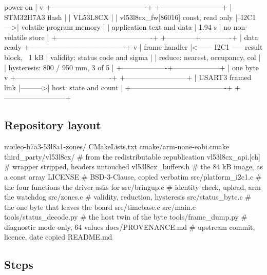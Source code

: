 \begin{asciiart}
  power-on
     |
     v
  +----------------------------------------+          +--------------------------+
  | STM32H7A3 flash                        |          | VL53L8CX                 |
  |   vl53l8cx_fw[86016] const, read only  |--I2C1--->| volatile program memory  |
  |   application text and data            |  1.94 s  |   no non-volatile store  |
  +----------------------------------------+          +------------+-------------+
                                                                   | data ready
  +----------------------------------------+                       v
  | frame handler                          |<------ I2C1 ----- result block, ~1 kB
  |   validity:   status code and sigma    |
  |   reduce:     nearest, occupancy, col  |
  |   hysteresis: 800 / 950 mm, 3 of 5     |
  +-------------------+--------------------+
                      | one byte
                      v
  +----------------------------------------+          +--------------------------+
  | USART3 framed link                     |--------->| host: state and count    |
  +----------------------------------------+          +--------------------------+
\end{asciiart}

\subsection*{Repository layout}

\begin{plaincode}
nucleo-h7a3-53l8a1-zones/
  CMakeLists.txt
  cmake/arm-none-eabi.cmake
  third_party/vl53l8cx/        # from the redistributable republication
    vl53l8cx_api.[ch]          # wrapper stripped, headers untouched
    vl53l8cx_buffers.h         # the 84 kB image, as a const array
    LICENSE                    # BSD-3-Clause, copied verbatim
  src/platform_i2c1.c          # the four functions the driver asks for
  src/bringup.c                # identity check, upload, arm the watchdog
  src/zones.c                  # validity, reduction, hysteresis
  src/status_byte.c            # the one byte that leaves the board
  src/timebase.c
  src/main.c
  tools/status_decode.py       # the host twin of the byte
  tools/frame_dump.py          # diagnostic mode only, 64 values
  docs/PROVENANCE.md           # upstream commit, licence, date copied
  README.md
\end{plaincode}

\subsection*{Steps}

